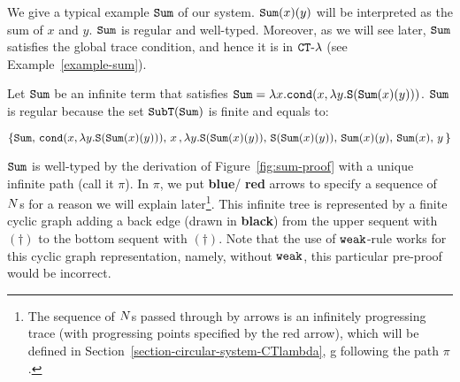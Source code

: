 
We give a typical example ${\tt Sum}$ of our system. ${\tt Sum}(x)(y)$ will be interpreted
as the sum of $x$ and $y$. ${\tt Sum}$ is regular and well-typed.
Moreover, as we will see later, ${\tt Sum}$ satisfies the global trace condition,
and hence it is in ${ {\tt CT}\mbox{-}\lambda}$ (see Example~\ref{example-sum}). 


\begin{example}\label{example-sum-first}
Let ${\tt Sum}$ be an infinite term that satisfies 
${\tt Sum} = \lambda x.{\tt cond}(x,\lambda y.{\tt S}({\tt Sum}(x)(y)))$.
${\tt Sum}$ is regular because the set ${\tt SubT}({\tt Sum})$ is finite and equals to: 
\begin{center}
  $\{{\tt Sum},\,{\tt cond}(x,\lambda y.{\tt S}({\tt Sum}(x)(y))),\,x\,,\lambda y.{\tt S}({\tt Sum}(x)(y)),\,{\tt S}({\tt Sum}(x)(y)),\,{\tt Sum}(x)(y),\,{\tt Sum}(x),\,y\,\}$
\end{center}
${\tt Sum}$ is well-typed by the derivation of Figure~\ref{fig:sum-proof}
with a unique infinite path (call it $\pi$).
In $\pi$, we put {\color{blue} \bf blue}/{\color{red} \bf red}
arrows to specify a sequence of ${N}$s for a reason we will explain later\footnote{
The sequence of ${N}$s passed through by arrows is an infinitely progressing trace (with progressing points specified by the red arrow), 
which will be defined in Section~\ref{section-circular-system-CTlambda}, g
following the path $\pi$.}.
This infinite tree is represented by a finite cyclic graph 
adding a back edge (drawn in {\color{black} \bf black}) 
from the upper sequent with $(\dagger)$
to the bottom sequent with $(\dagger)$.
Note that the use of ${\tt weak}$-rule works for this cyclic graph representation,
namely, without ${\tt weak}$, this particular pre-proof would be incorrect.


\end{example}
